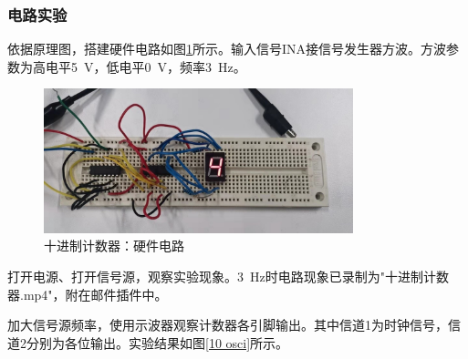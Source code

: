 \documentclass[UTF8]{ctexart}
\numberwithin{figure}{subsection}
\numberwithin{table}{subsection}
\numberwithin{equation}{subsection}
\begin{document}
\subsubsection{电路实验}
\par 依据原理图，搭建硬件电路如图\ref{10 cir}所示。输入信号INA接信号发生器方波。方波参数为高电平\SI{5}{\volt}，低电平\SI{0}{\volt}，频率\SI{3}{\hertz}。

\begin{figure}[H]
    \begin{center}
        \includegraphics[width=0.8\textwidth]{10/circuit.jpg}
    \end{center}
    \caption{十进制计数器：硬件电路}
    \label{10 cir}
\end{figure}

\par 打开电源、打开信号源，观察实验现象。\SI{3}{\hertz}时电路现象已录制为"十进制计数器.mp4"，附在邮件插件中。
\par 加大信号源频率，使用示波器观察计数器各引脚输出。其中信道1为时钟信号，信道2分别为各位输出。实验结果如图\ref{10 osci}所示。
\end{document}
